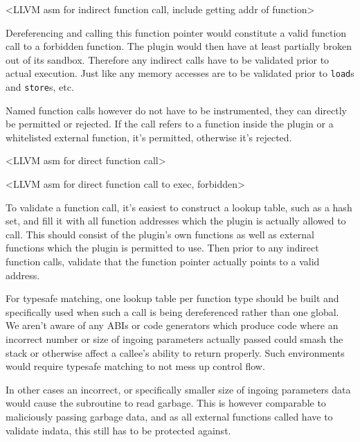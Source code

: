 <LLVM asm for indirect function call, include getting addr of function>

Dereferencing and calling this function pointer would constitute a valid
function call to a forbidden function. The plugin would then have at least
partially broken out of its sandbox. Therefore any indirect calls have to be
validated prior to actual execution. Just like any memory accesses are to be
validated prior to \texttt{load}s and \texttt{store}s, etc.

Named function calls however do not have to be instrumented, they can directly
be permitted or rejected. If the call refers to a function inside the plugin or
a whitelisted external function, it's permitted, otherwise it's rejected.

<LLVM asm for direct function call>

<LLVM asm for direct function call to exec, forbidden>

To validate a function call, it's easiest to construct a lookup table, such as a
hash set, and fill it with all function addresses which the plugin is actually
allowed to call. This should consist of the plugin's own functions as well as
external functions which the plugin is permitted to use. Then prior to any
indirect function calls, validate that the function pointer actually points to a
valid address.

For typesafe matching, one lookup table per function type should be built and
specifically used when such a call is being dereferenced rather than one global.
We aren't aware of any ABIs or code generators which produce code where an
incorrect number or size of ingoing parameters actually passed could smash the
stack or otherwise affect a callee's ability to return properly. Such
environments would require typesafe matching to not mess up control flow.

In other cases an incorrect, or specifically smaller size of ingoing parameters
data would cause the subroutine to read garbage. This is however comparable to
maliciously passing garbage data, and as all external functions called have to
validate indata, this still has to be protected against.
